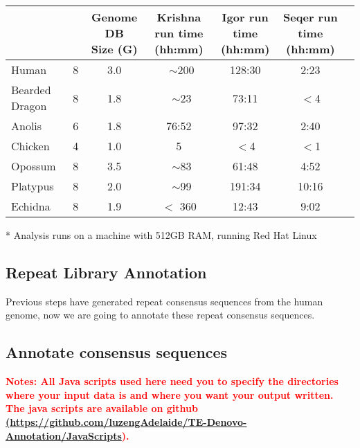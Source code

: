 \documentclass[12pt]{report}
\begin{document}
\footnotesize  %
\setlength\tabcolsep{1.5pt}
\begin{center}
	\begin{tabular}{|l|c|c|c|c|c|c|}
		\hline
		\thead{Genome}	&	\thead{ Krishna Threads }	&	\thead{Genome DB \\ Size (G)}	& \thead{Krishna run time \\ (hh:mm)}	&	\thead{Igor run time \\ (hh:mm)}	&	\thead{Seqer run time \\ (hh:mm)}  \\
		\hline
		Human	&	8	&	3.0	&	~$\sim$200	&	128:30	&	2:23 \\
		\hline 
		Bearded Dragon	&	8	&	1.8	&	~$\sim$23	&	73:11	&	$<$4 \\
		\hline
		Anolis	& 6	& 1.8	& 76:52	&	97:32	& 2:40	\\
		\hline
		Chicken	&	4	&	1.0	&	5	&	$<$4 & $<$1 \\
		\hline
		Opossum	&	8	&	3.5	&	~$\sim$83	&	61:48	&	4:52 \\
		\hline
		Platypus	&	8	&	2.0	&	~$\sim$99	&	191:34	&	10:16 \\
		\hline
		Echidna	&	8	&	1.9	&	$<$ 360	&	12:43	&	9:02 \\
		\hline
	\end{tabular}
\end{center}

* Analysis runs on a machine with 512GB RAM, running Red Hat Linux \\


\subsection*{Repeat Library Annotation}
Previous steps have generated repeat consensus sequences from the human genome, now we are going to annotate these repeat consensus sequences.

\subsection*{Annotate consensus sequences}
\textbf{\textcolor{red}{Notes: All Java scripts used here need you to specify the directories where your input data is and where you want your output written. The java scripts are available on github \href{<url>}(\url{https://github.com/luzengAdelaide/TE-Denovo-Annotation/JavaScripts}). }}
\end{document}
